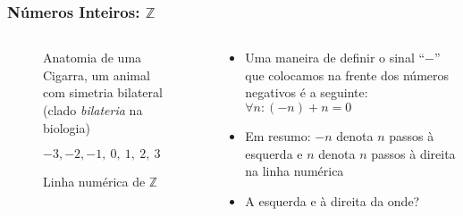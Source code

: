 \documentclass[usenames,dvipsnames,svgnames]{beamer}
\begin{document}
\begin{frame}
	
	\frametitle{Números Inteiros: $\mathbb{Z}$}

	\begin{columns}[t]
	\begin{column}{.3\textwidth}
		\begin{figure}
			\caption{\small Anatomia de uma Cigarra, um animal com simetria bilateral (clado \emph{bilateria} na biologia)}
		\end{figure}
		\begin{figure}
			\small $-3, -2, -1, ~0, ~1, ~2, ~3$
			\caption{\small Linha numérica de $\mathbb{Z}$}
		\end{figure}
	\end{column}
	\begin{column}{.7\textwidth}
		\begin{itemize}
		\item Uma maneira de definir o sinal ``$-$'' que colocamos na frente dos números negativos é a seguinte: $\forall n: (-n) + n = 0$
		\item Em resumo: $-n$ denota $n$ passos à esquerda e $n$ denota $n$ passos à direita na linha numérica
		\item A esquerda e à direita da onde?
		\end{itemize}
	\end{column}
	\end{columns}

\end{frame}
\end{document}
